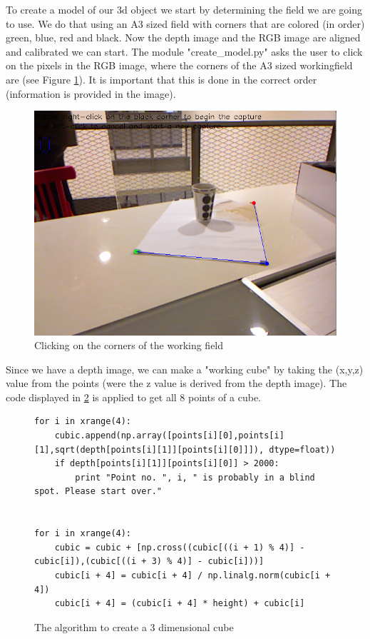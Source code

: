 To create a model of our 3d object we start by determining the field we are going to use. We do that using an A3 sized field with corners that are colored (in order) green, blue, red and black. Now the depth image and the RGB image are aligned and calibrated we can start. The module "create\_model.py" asks the user to click on the pixels in the RGB image, where the corners of the A3 sized workingfield are (see Figure \ref{fig:clicking}). It is important that this is done in the correct order (information is provided in the image).
\begin{figure}[H]
\centering
\includegraphics[scale=0.5]{images/clicking.png}
\caption{Clicking on the corners of the working field}
\label{fig:clicking}
\end{figure}
Since we have a depth image, we can make a "working cube" by taking the (x,y,z) value from the points (were the z value is derived from the depth image). The code displayed in \ref{code:cube} is applied to get all 8 points of a cube.\\
\begin{figure}[H]
\begin{lstlisting}
for i in xrange(4):
    cubic.append(np.array([points[i][0],points[i][1],sqrt(depth[points[i][1]][points[i][0]]]), dtype=float))
    if depth[points[i][1]][points[i][0]] > 2000:
        print "Point no. ", i, " is probably in a blind spot. Please start over."


for i in xrange(4):
    cubic = cubic + [np.cross((cubic[((i + 1) % 4)] - cubic[i]),(cubic[((i + 3) % 4)] - cubic[i]))]
    cubic[i + 4] = cubic[i + 4] / np.linalg.norm(cubic[i + 4])
    cubic[i + 4] = (cubic[i + 4] * height) + cubic[i]
\end{lstlisting}
\caption{The algorithm to create a 3 dimensional cube}
\label{code:cube}
\end{figure}

